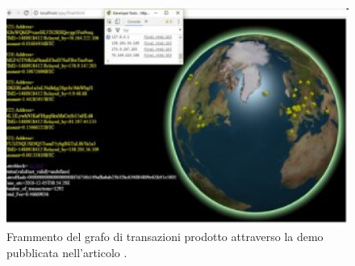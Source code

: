 \begin{figure}[H]
\centering
\includegraphics[scale=0.1]{images/vs_article.pdf}
\caption{Frammento del grafo di transazioni prodotto attraverso la demo pubblicata nell'articolo \cite{BitcoinBlockchainTransactionsVisualization:article}.\label{fig:bitcoinTransactionVis}}
\end{figure}
